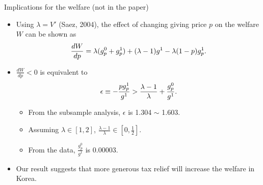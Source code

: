 \documentclass[dvipdfmx,10pt]{beamer}
\begin{document}
\begin{frame}{Implications for the welfare (not in the paper)}
	\begin{itemize}
		\item Using $\lambda=V'$ (Saez, 2004), the effect of changing giving price $p$ on the welfare $W$ can be shown as 
		\begin{align}
			\frac{dW}{dp} =\lambda (g_p^0+g_p^1)+(\lambda-1)g^1-\lambda(1-p)g_p^1\notag.
		\end{align}
		\item $\frac{dW}{dp}<0$ is equivalent to
		\begin{align}
			\epsilon\equiv -\frac{pg_p^1}{g^1}>\frac{\lambda-1}{\lambda}+\frac{g_p^0}{g^1}\notag.
		\end{align}
		\begin{itemize}
		\item From the subsample analysis, $\epsilon$ is 1.304 $\sim$ 1.603.
		\item Assuming $\lambda\in[1,2]$, $\frac{\lambda-1}{\lambda}\in[0,\frac12]$.
		\item From the data, $\frac{g_p^0}{g^1}$ is 0.00003.
		\end{itemize}
		\item Our result suggests that more generous tax relief will increase the welfare in Korea.
	\end{itemize}
\end{frame}
\end{document}
